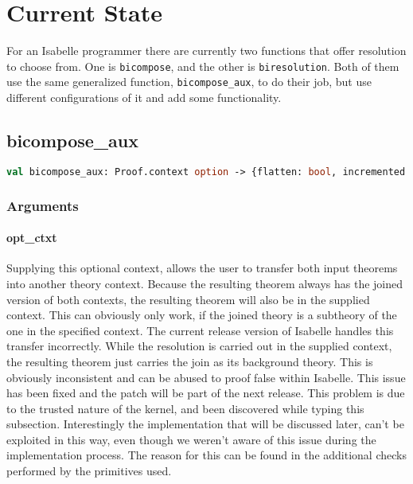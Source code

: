 \chapter{Current State}\label{chapter:current}

For an Isabelle programmer there are currently two functions that offer resolution to choose from. One is \texttt{bicompose}, and the other is \texttt{biresolution}. Both of them use the same generalized function, \texttt{bicompose\_aux}, to do their job, but use different configurations of it and add some functionality.

\section{bicompose\_aux}

\begin{lstlisting}[language=ML,breaklines=true]
val bicompose_aux: Proof.context option -> {flatten: bool, incremented: bool, match: bool} -> thm * ((term * term) list * term list * term * term) * bool -> bool * thm * int -> thm Seq.seq
\end{lstlisting}

\subsection{Arguments}

\subsubsection{opt\_ctxt}
Supplying this optional context, allows the user to transfer both input theorems into another theory context. 
Because the resulting theorem always has the joined version of both contexts, the resulting theorem will also be in the supplied context. This can obviously only work, if the joined theory is a subtheory of the one in the specified context.\newline
The current release version of Isabelle handles this transfer incorrectly. While the resolution is carried out in the supplied context, the resulting theorem just carries the join as its background theory. This is obviously inconsistent and can be abused to proof false within Isabelle. This issue has been fixed and the patch will be part of the next release.\newline
This problem is due to the trusted nature of the kernel, and been discovered while typing this subsection. Interestingly the implementation that will be discussed later, can't be exploited in this way, even though we weren't aware of this issue during the implementation process. The reason for this can be found in the additional checks performed by the primitives used.\newline


